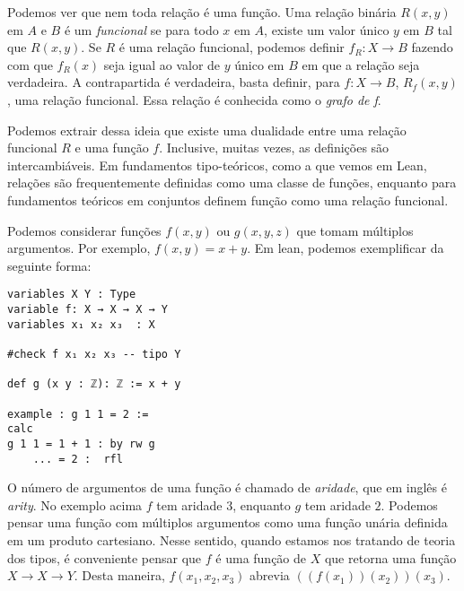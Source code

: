 Podemos ver que nem toda relação é uma função. Uma relação binária $R(x,y)$ em $A$ e $B$ 
é um \textit{funcional} se para todo $x$ em $A$, existe um valor único $y$ em $B$ tal que 
$R(x,y)$. Se $R$ é uma relação funcional, podemos definir $f_R: X \to B$ fazendo com que 
$f_R(x)$ seja igual ao valor de $y$ único em $B$ em que a relação seja verdadeira. A 
contrapartida é verdadeira, basta definir, para $f: X \to B$, $R_f(x,y)$, uma relação funcional. 
Essa relação é conhecida como o \textit{grafo de f}. 

Podemos extrair dessa ideia que existe uma dualidade entre uma relação funcional $R$ e uma 
função $f$. Inclusive, muitas vezes, as definições são intercambiáveis. Em fundamentos tipo-teóricos, 
como a que vemos em Lean, relações são frequentemente definidas como uma classe de funções, enquanto 
para fundamentos teóricos em conjuntos definem função como uma relação funcional. 

Podemos considerar funções $f(x,y)$ ou $g(x,y,z)$ que tomam múltiplos argumentos. Por exemplo, 
$f(x,y) = x + y$. Em lean, podemos exemplificar da seguinte forma: 

\begin{lstlisting}
variables X Y : Type 
variable f: X → X → X → Y 
variables x₁ x₂ x₃  : X

#check f x₁ x₂ x₃ -- tipo Y

def g (x y : ℤ): ℤ := x + y

example : g 1 1 = 2 := 
calc 
g 1 1 = 1 + 1 : by rw g 
    ... = 2 :  rfl
\end{lstlisting}

O número de argumentos de uma função é chamado de \textit{aridade}, que em inglês é \textit{arity}. 
No exemplo acima $f$ tem aridade $3$, enquanto $g$ tem aridade $2$.
Podemos pensar uma função com múltiplos argumentos como uma função unária definida em um produto cartesiano. 
Nesse sentido, quando estamos nos tratando de teoria dos tipos, é conveniente pensar que $f$ é uma função de $X$
que retorna uma função $X \to X \to Y$. Desta maneira, $f(x_1, x_2, x_3)$ abrevia $((f(x_1))(x_2))(x_3)$.

